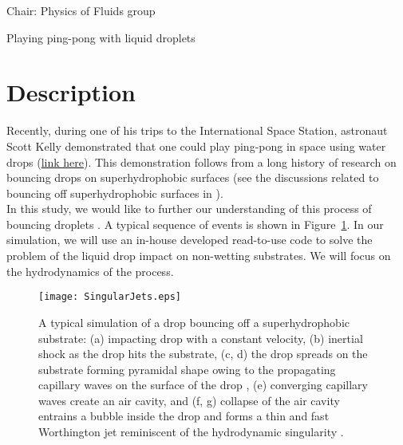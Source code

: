 \documentclass[a4paper,10pt]{article}
\begin{document}
\noindent Chair: Physics of Fluids group
\begin{center}
 \begin{LARGE}
  Playing ping-pong with liquid droplets
 \end{LARGE}
\end{center}

\section*{Description}

Recently, during one of his trips to the International Space Station, astronaut Scott Kelly demonstrated that one could play ping-pong in space using water drops (\href{https://www.youtube.com/watch?v=TLbhrMCM4_0}{link here}). This demonstration follows from a long history of research on bouncing drops on superhydrophobic surfaces (see the discussions related to bouncing off superhydrophobic surfaces in \citet{josserand2016drop, VatsalThesis}).\\

In this study, we would like to further our understanding of this process of bouncing droplets \citep{zhang2022impact, vatsalInProgress, sanjay2022drop}. A typical sequence of events is shown in Figure~\ref{Figure::Typical}. In our simulation, we will use an in-house developed read-to-use code to solve the problem of the liquid drop impact on non-wetting substrates. We will focus on the hydrodynamics of the process. 

\begin{figure}[H]
\begin{center}
 \texttt{[image: SingularJets.eps]}
 \caption{A typical simulation of a drop bouncing off a superhydrophobic substrate: (a) impacting drop with a constant velocity, (b) inertial shock as the drop hits the substrate, (c, d) the drop spreads on the substrate forming pyramidal shape owing to the propagating capillary waves on the surface of the drop \citep{renardy2003pyramidal, zhang2022impact}, (e) converging capillary waves create an air cavity, and (f, g) collapse of the air cavity entrains a bubble inside the drop and forms a thin and fast Worthington jet reminiscent of the hydrodynamic singularity \citep{Bartolo2006Singular}.}
 \label{Figure::Typical}
\end{center}

\end{figure}
\end{document}
